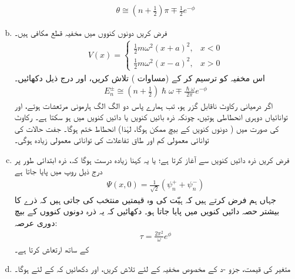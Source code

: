 \begin{enumerate}[a.]
\begin{align}
	\theta\cong\left(n+\frac{1}{2}\right)\pi\mp\frac{1}{2}e^{-\phi}
\end{align}
\item
 فرض کریں دونوں کنووں میں مخفیہ قطع مکافی ہیں۔
\begin{align}
	V(x)=
	\begin{cases}
		\frac{1}{2}m\omega^{2}(x+a)^{2},& x< 0 \\
		\frac{1}{2}m\omega^{2}(x-a)^{2},& x> 0
	\end{cases}
\end{align}
اس مخفیہ کو ترسیم کر کے  (مساوات ) تلاش کریں، اور درج ذیل دکھائیں۔
\begin{align}\label{مساوات_وقب_نتیجہ_قطع_مکافی}
	E^{\pm}_{n}\cong\left(n+\frac{1}{2}\right)\hslash\omega\mp\frac{\hslash\omega}{2\pi} e^{-\phi}
\end{align}
 اگر درمیانی رکاوٹ ناقابل گزر ہو، تب ہمارے پاس دو الگ الگ ہارمونی مرتعشات ہوتے، اور توانائیاں  دوہری انحطاطی ہوتیں، چونکہ ذرہ بائیں کنویں یا دائیں کنویں میں ہو سکتا ہے۔  رکاوٹ کی صورت میں ( دونوں کنویں کے بیچ  ممکن ہوگا، لہٰذا) انحطاط ختم ہوگا۔ جفت حالات  کی توانائی معمولی کم اور طاق تفاعلات  کی توانائی معمولی زیادہ ہوگی۔
\item
 فرض کریں ذرہ دائیں کنویں سے آغاز کرتا ہے؛ یا یہ کہنا زیادہ درست ہوگا کہ، ذرہ ابتدائی طور پر درج ذیل روپ میں پایا جاتا ہے 
\begin{align*}
	\Psi(x,0)=\frac{1}{\sqrt{2}}(\psi^{+}_{n}+\psi^{-}_{n})
\end{align*}
جہاں ہم فرض کرتے ہیں کہ ہیّت کی وہ قیمتیں منتخب کی جاتی ہیں کہ ذرے کا بیشتر حصہ دائیں کنویں میں پایا جاتا ہو۔ دکھائیں کہ یہ ذرہ دونوں کنووں کے بیچ دوری عرصہ:
\begin{align}
	\tau=\frac{2\pi^{2}}{\omega} e^{\phi}
\end{align}
کے ساتھ ارتعاش کرتا ہے۔
\item
 متغیر  کی قیمت، جزو -د کے مخصوص مخفیہ کے لئے تلاش کریں، اور دکھائیں کہ کے لئے  ہوگا۔
 \end{enumerate}
